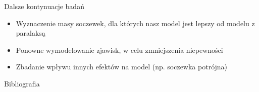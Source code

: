 \documentclass{beamer}
\begin{document}
\begin{frame}{Dalsze kontynuacje badań}
    \begin{itemize}
        \item Wyznaczenie masy soczewek, dla których nasz model jest lepszy od modelu z paralaksą
        \item Ponowne wymodelowanie zjawisk, w celu zmniejszenia niepewności
        \item Zbadanie wpływu innych efektów na model (np. soczewka potrójna)
    \end{itemize}
\end{frame}

\begin{frame}{Bibliografia}

    \printbibliography
    \nocite{*}
\end{frame}
\end{document}

